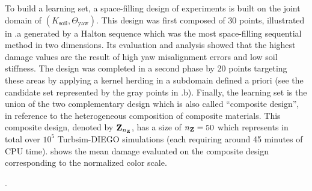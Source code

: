 To build a learning set, a space-filling design of experiments is built on the joint domain of $(K_{\mathrm{soil}}, \Theta_{\mathrm{yaw}})$. 
This design was first composed of 30 points, illustrated in .a generated by a Halton sequence which was the most space-filling sequential method in two dimensions. 
Its evaluation and analysis showed that the highest damage values are the result of high yaw misalignment errors and low soil stiffness. 
The design was completed in a second phase by 20 points targeting these areas by applying a kernel herding in a subdomain defined a priori (see the candidate set represented by the gray points in .b). 
Finally, the learning set is the union of the two complementary design which is also called ``composite design'', in reference to the heterogeneous composition of composite materials. 
This composite design, denoted by ${\bf Z}_{n_{\bf Z}}$, has a size of $n_{\bf Z}=50$ which represents in total over $10^5$ Turbsim-DIEGO simulations (each requiring around 45 minutes of CPU time).
 shows the mean damage evaluated on the composite design corresponding to the normalized color scale. 


. 


